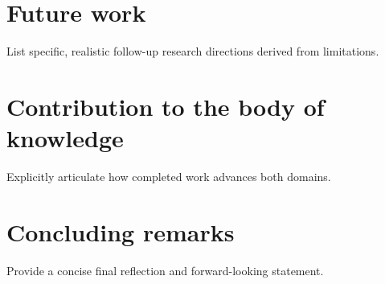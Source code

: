 \section{Future work}
List specific, realistic follow-up research directions derived from limitations.

\section{Contribution to the body of knowledge}
Explicitly articulate how completed work advances both domains.

\section{Concluding remarks}
Provide a concise final reflection and forward-looking statement.
